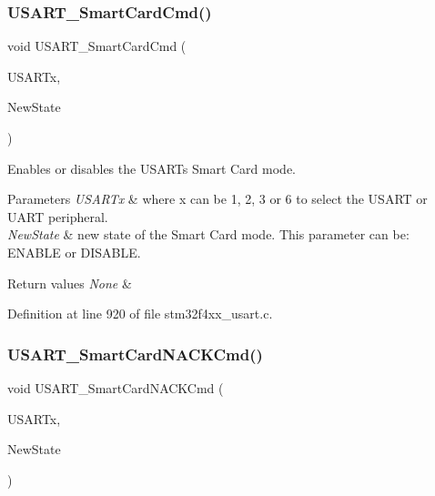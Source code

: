 \subsubsection{\texorpdfstring{U\+S\+A\+R\+T\+\_\+\+Smart\+Card\+Cmd()}{USART\_SmartCardCmd()}}
{\footnotesize\ttfamily void U\+S\+A\+R\+T\+\_\+\+Smart\+Card\+Cmd (\begin{DoxyParamCaption}\item[{\hyperlink{struct_u_s_a_r_t___type_def}{U\+S\+A\+R\+T\+\_\+\+Type\+Def} $\ast$}]{U\+S\+A\+R\+Tx,  }\item[{Functional\+State}]{New\+State }\end{DoxyParamCaption})}



Enables or disables the U\+S\+A\+RT\textquotesingle{}s Smart Card mode. 


\begin{DoxyParams}{Parameters}
{\em U\+S\+A\+R\+Tx} & where x can be 1, 2, 3 or 6 to select the U\+S\+A\+RT or U\+A\+RT peripheral. \\
\hline
{\em New\+State} & new state of the Smart Card mode. This parameter can be\+: E\+N\+A\+B\+LE or D\+I\+S\+A\+B\+LE. \\
\hline
\end{DoxyParams}

\begin{DoxyRetVals}{Return values}
{\em None} & \\
\hline
\end{DoxyRetVals}


Definition at line 920 of file stm32f4xx\+\_\+usart.\+c.

\mbox{\label{group___u_s_a_r_t___group6_ga62e22f47e38aa53f2edce8771f7a5dfa}} 
\subsubsection{\texorpdfstring{U\+S\+A\+R\+T\+\_\+\+Smart\+Card\+N\+A\+C\+K\+Cmd()}{USART\_SmartCardNACKCmd()}}
{\footnotesize\ttfamily void U\+S\+A\+R\+T\+\_\+\+Smart\+Card\+N\+A\+C\+K\+Cmd (\begin{DoxyParamCaption}\item[{\hyperlink{struct_u_s_a_r_t___type_def}{U\+S\+A\+R\+T\+\_\+\+Type\+Def} $\ast$}]{U\+S\+A\+R\+Tx,  }\item[{Functional\+State}]{New\+State }\end{DoxyParamCaption})}



